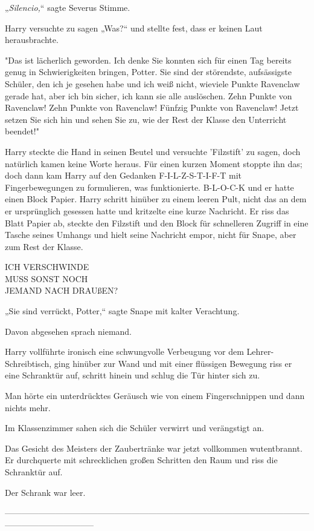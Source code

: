 {„\emph{Silencio,}“ sagte Severus Stimme.

Harry versuchte zu sagen „Was?“ und stellte fest, dass er keinen Laut herausbrachte.

"Das ist lächerlich geworden. Ich denke Sie konnten sich für einen Tag bereits genug in Schwierigkeiten bringen, Potter. Sie sind der störendste, aufsässigste Schüler, den ich je gesehen habe und ich weiß nicht, wieviele Punkte Ravenclaw gerade hat, aber ich bin sicher, ich kann sie alle auslöschen. Zehn Punkte von Ravenclaw! Zehn Punkte von Ravenclaw! Fünfzig Punkte von Ravenclaw! Jetzt setzen Sie sich hin und sehen Sie zu, wie der Rest der Klasse den Unterricht beendet!"

Harry steckte die Hand in seinen Beutel und versuchte 'Filzstift' zu sagen, doch natürlich kamen keine Worte heraus. Für einen kurzen Moment stoppte ihn das; doch dann kam Harry auf den Gedanken F-I-L-Z-S-T-I-F-T mit Fingerbewegungen zu formulieren, was funktionierte. B-L-O-C-K und er hatte einen Block Papier. Harry schritt hinüber zu einem leeren Pult, nicht das an dem er ursprünglich gesessen hatte und kritzelte eine kurze Nachricht. Er riss das Blatt Papier ab, steckte den Filzstift und den Block für schnelleren Zugriff in eine Tasche seines Umhangs und hielt seine Nachricht empor, nicht für Snape, aber zum Rest der Klasse.

ICH VERSCHWINDE\\ MUSS SONST NOCH\\ JEMAND NACH DRAUßEN?

„Sie sind verrückt, Potter,“ sagte Snape mit kalter Verachtung.

Davon abgesehen sprach niemand.

Harry vollführte ironisch eine schwungvolle Verbeugung vor dem Lehrer-Schreibtisch, ging hinüber zur Wand und mit einer flüssigen Bewegung riss er eine Schranktür auf, schritt hinein und schlug die Tür hinter sich zu.

Man hörte ein unterdrücktes Geräusch wie von einem Fingerschnippen und dann nichts mehr.

Im Klassenzimmer sahen sich die Schüler verwirrt und verängstigt an.

Das Gesicht des Meisters der Zaubertränke war jetzt vollkommen wutentbrannt. Er durchquerte mit schrecklichen großen Schritten den Raum und riss die Schranktür auf.

Der Schrank war leer.

--------------------------------------------------------------------------------------------------------------------------------------------

}
